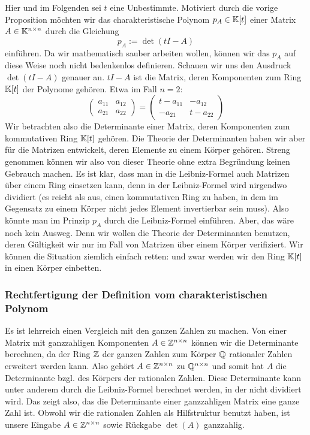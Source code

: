 \noindent Hier und im Folgenden sei $ t $ eine Unbestimmte. Motiviert durch die vorige Proposition möchten wir das charakteristische Polynom $ p_A \in \mathbb K[t] $ einer Matrix $ A \in \mathbb K^{n \times n} $ durch die Gleichung
\begin{equation} \label{p_A}
	p_A := \det(t I - A)
\end{equation}
einführen. Da wir mathematisch sauber arbeiten wollen, können wir das $p_A$ auf diese Weise  noch nicht bedenkenlos definieren. Schauen wir uns den Ausdruck $\det(t I - A)$ genauer an. $t I - A$ ist die Matrix, deren Komponenten zum Ring $\mathbb K[t]$ der Polynome gehören. Etwa im Fall $n=2$:
\[
	 \begin{pmatrix} a_{11} & a_{12} \\ a_{21} & a_{22} \end{pmatrix}  = \begin{pmatrix} t-a_{11} & -a_{12} \\ -a_{21} & t- a_{22} \end{pmatrix} 
\]
Wir betrachten also die Determinante einer Matrix, deren Komponenten zum kommutativen Ring $\mathbb K[t]$ gehören. Die Theorie der Determinanten haben wir aber für die Matrizen entwickelt, deren Elemente zu einem Körper gehören. Streng genommen können wir also von dieser Theorie ohne extra Begründung keinen Gebrauch machen. Es ist klar, dass man in die Leibniz-Formel auch Matrizen über einem Ring einsetzen kann, denn in der Leibniz-Formel wird nirgendwo dividiert (es reicht als aus, einen kommutativen Ring zu haben, in dem im Gegensatz zu einem Körper nicht jedes Element invertierbar sein muss). Also könnte man im Prinzip $p_A$ durch die Leibniz-Formel einführen. Aber, das wäre noch kein Ausweg. Denn wir wollen die Theorie der Determinanten benutzen, deren Gültigkeit wir nur im Fall von Matrizen über einem Körper verifiziert. Wir können die Situation ziemlich einfach retten: und zwar werden wir den Ring $\mathbb K[t]$ in einen Körper einbetten. 

\subsubsection{Rechtfertigung der Definition vom charakteristischen Polynom}

Es ist lehrreich einen Vergleich mit den ganzen Zahlen zu machen. Von einer Matrix mit ganzzahligen Komponenten $A \in \mathbb Z^{n \times n}$ können wir die Determinante berechnen, da der Ring $\mathbb Z$ der ganzen Zahlen zum Körper $\mathbb Q$ rationaler Zahlen erweitert werden kann. Also gehört $A  \in \mathbb Z^{n \times n}$ zu $\mathbb Q^{n \times n}$ und somit hat $A$ die Determinante bzgl. des Körpers der rationalen Zahlen. Diese Determinante kann unter anderem durch die Leibniz-Formel berechnet werden, in der nicht dividiert wird. Das zeigt also, das die Determinante einer ganzzahligen Matrix eine ganze Zahl ist.  Obwohl wir die rationalen Zahlen als Hilfstruktur benutzt haben, ist unsere Eingabe $A \in \mathbb Z^{n \times n}$ sowie Rückgabe $\det(A)$ ganzzahlig. 



